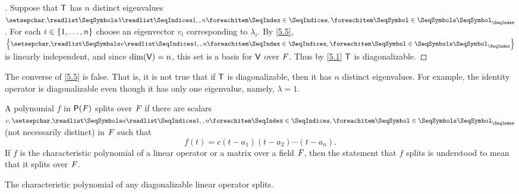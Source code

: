 \begin{proof}[]
  Suppose that \(\mathsf{T}\) has \(n\) distinct eigenvalues \(\seq{\lambda}{1,,n}\).
  For each \(i \in \left\lbrace1, \dots, n\right\rbrace\) choose an eigenvector \(v_i\) corresponding to \(\lambda_i\).
  By \cref{5.5}, \(\set{\seq{v}{1,,n}}\) is linearly independent, and since \(\dim(\mathsf{V}) = n\), this set is a basis for \(\mathsf{V}\) over \(\mathit{F}\).
  Thus by \cref{5.1} \(\mathsf{T}\) is diagonalizable.
\end{proof}

\begin{note}
  The converse of \cref{5.5} is false.
  That is, it is not true that if \(\mathsf{T}\) is diagonalizable, then it has \(n\) distinct eigenvalues.
  For example, the identity operator is diagonalizable even though it has only one eigenvalue, namely, \(\lambda = 1\).
\end{note}

\begin{defn}\label{5.2.2}
  A polynomial \(f\) in \(\ps{\F}\) splits over \(\mathit{F}\) if there are scalars \(c, \seq{a}{1,,n}\) (not necessarily distinct) in \(\mathit{F}\) such that
  \[
    f(t) = c (t - a_1) (t - a_2) \cdots (t - a_n).
  \]
  If \(f\) is the characteristic polynomial of a linear operator or a matrix over a field \(\mathit{F}\), then the statement that \(f\) splits is understood to mean that it splits over \(\mathit{F}\).
\end{defn}

\begin{thm}\label{5.6}
  The characteristic polynomial of any diagonalizable linear operator splits.
\end{thm}

